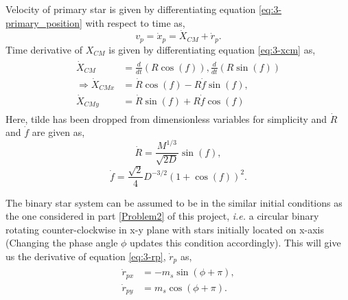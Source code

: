 \documentclass[a4paper]{article}
\begin{document}
\begin{enumerate} [label*=\textbf{(\alph*)}]
					Velocity of primary star is given by differentiating equation \ref{eq:3-primary_position} with respect to time as,
					\begin{equation}
						v_p = \dot{x}_p = \dot{X}_{CM}^{} +\dot{r}_p.
						\label{eq:3-vp}
					\end{equation}
					Time derivative of \(X_{CM}^{}\) is given by differentiating equation \ref{eq:3-xcm} as,
					\begin{equation}
						\begin{gathered}
							\begin{aligned}
								\dot{X}_{CM}^{} &= \frac{d}{dt} (R \cos(f)), \frac{d}{dt} (R \sin(f)) \\
								\Rightarrow \dot{X}_{CMx} &= \dot{R} \cos(f) - R \dot{f} \sin(f), \\
								\dot{X}_{CMy} &= \dot{R} \sin(f) + R \dot{f} \cos(f)
							\end{aligned}
						\end{gathered}
						\label{eq:3-vcm}
					\end{equation}
					Here, tilde has been dropped from dimensionless variables for simplicity and \(\dot{R}\) and \(\dot{f}\) are given as,
					\begin{equation}
						\dot{R} = \frac{M^{1/3}}{\sqrt{2D}} \sin(f),
						\label{eq:3-rdot}
					\end{equation}
					\begin{equation}
						\dot{f} = \frac{\sqrt{2}}{4} D^{-3/2} \left( 1+\cos(f) \right)^2 .
						\label{eq:3-fdot}
					\end{equation}
					
					The binary star system can be assumed to be in the similar initial conditions as the one considered in part \ref{Problem2} of this project, \textit{i.e.} a circular binary rotating counter-clockwise in x-y plane with stars initially located on x-axis (Changing the phase angle \(\phi\) updates this condition accordingly). This will give us the derivative of equation \ref{eq:3-rp}, \(\dot{r}_p\) as,
					\begin{equation}
						\begin{gathered}
							\begin{aligned}
								\dot{r}_{px} &= -m_s \sin(\phi + \pi), \\
								\dot{r}_{py} &= m_s \cos(\phi + \pi).
							\end{aligned}
						\end{gathered} 
						\label{eq:3-vp_binary}
					\end{equation}
					

\end{enumerate}
\end{document}
